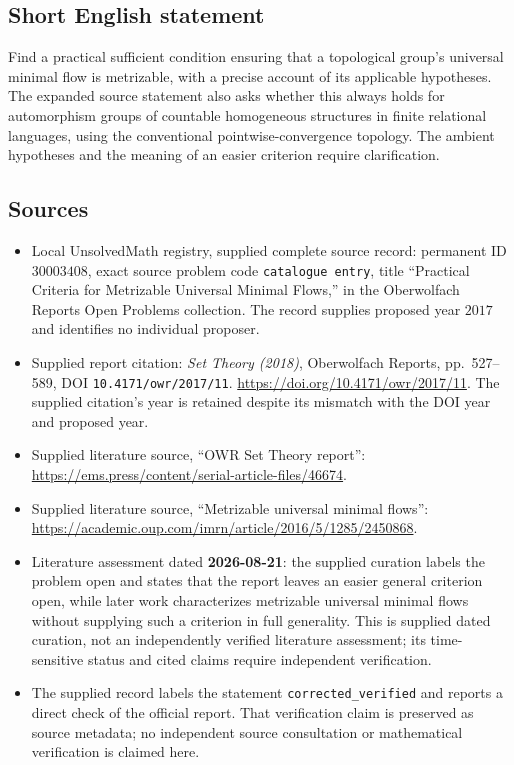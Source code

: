 \documentclass[11pt]{article}
\begin{document}
\subsection{Short English statement}
Find a practical sufficient condition ensuring that a topological group's universal minimal flow is metrizable, with a precise account of its applicable hypotheses. The expanded source statement also asks whether this always holds for automorphism groups of countable homogeneous structures in finite relational languages, using the conventional pointwise-convergence topology. The ambient hypotheses and the meaning of an easier criterion require clarification.
\subsection{Sources}
\begin{itemize}
\item Local UnsolvedMath registry, supplied complete source record: permanent ID \(30003408\), exact source problem code \texttt{catalogue entry}, title ``Practical Criteria for Metrizable Universal Minimal Flows,'' in the Oberwolfach Reports Open Problems collection. The record supplies proposed year \(2017\) and identifies no individual proposer.
\item Supplied report citation: \emph{Set Theory (2018)}, Oberwolfach Reports, pp.~527--589, DOI \texttt{10.4171/owr/2017/11}. \url{https://doi.org/10.4171/owr/2017/11}. The supplied citation's year is retained despite its mismatch with the DOI year and proposed year.
\item Supplied literature source, ``OWR Set Theory report'': \url{https://ems.press/content/serial-article-files/46674}.
\item Supplied literature source, ``Metrizable universal minimal flows'': \url{https://academic.oup.com/imrn/article/2016/5/1285/2450868}.
\item Literature assessment dated \textbf{2026-08-21}: the supplied curation labels the problem open and states that the report leaves an easier general criterion open, while later work characterizes metrizable universal minimal flows without supplying such a criterion in full generality. This is supplied dated curation, not an independently verified literature assessment; its time-sensitive status and cited claims require independent verification.
\item The supplied record labels the statement \texttt{corrected\_verified} and reports a direct check of the official report. That verification claim is preserved as source metadata; no independent source consultation or mathematical verification is claimed here.
\end{itemize}
\end{document}
